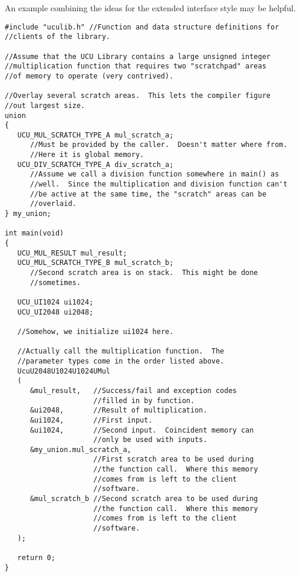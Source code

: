 An example combining the ideas for the extended interface 
style may be helpful.  

\begin{verbatim}
#include "uculib.h" //Function and data structure definitions for //clients of the library.

//Assume that the UCU Library contains a large unsigned integer
//multiplication function that requires two "scratchpad" areas
//of memory to operate (very contrived).

//Overlay several scratch areas.  This lets the compiler figure
//out largest size.
union
{
   UCU_MUL_SCRATCH_TYPE_A mul_scratch_a;
      //Must be provided by the caller.  Doesn't matter where from.
      //Here it is global memory.
   UCU_DIV_SCRATCH_TYPE_A div_scratch_a;
      //Assume we call a division function somewhere in main() as
      //well.  Since the multiplication and division function can't
      //be active at the same time, the "scratch" areas can be
      //overlaid.
} my_union;

int main(void)
{
   UCU_MUL_RESULT mul_result;
   UCU_MUL_SCRATCH_TYPE_B mul_scratch_b;
      //Second scratch area is on stack.  This might be done
      //sometimes.

   UCU_UI1024 ui1024;
   UCU_UI2048 ui2048;

   //Somehow, we initialize ui1024 here.

   //Actually call the multiplication function.  The
   //parameter types come in the order listed above.
   UcuU2048U1024U1024UMul
   (
      &mul_result,   //Success/fail and exception codes
                     //filled in by function.
      &ui2048,       //Result of multiplication.
      &ui1024,       //First input.
      &ui1024,       //Second input.  Coincident memory can
                     //only be used with inputs.
      &my_union.mul_scratch_a,
                     //First scratch area to be used during
                     //the function call.  Where this memory
                     //comes from is left to the client
                     //software.
      &mul_scratch_b //Second scratch area to be used during
                     //the function call.  Where this memory
                     //comes from is left to the client
                     //software.
   );

   return 0;
}
\end{verbatim}


